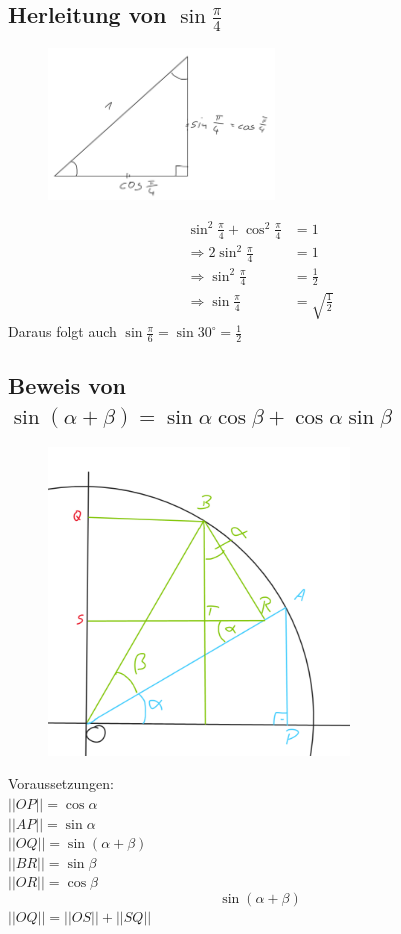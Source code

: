 \documentclass[a4paper,onecolumn,pdftex]{report}
\begin{document}
    \subsection*{Herleitung von $\sin\frac{\pi}{4}$}
    \begin{figure}
        \includegraphics[width=6cm]{2023-10-11_23h34_34.png}
    \end{figure}
    \begin{align*}
        \sin^2\frac{\pi}{4}+\cos^2\frac{\pi}{4}&=1 \\
        \Rightarrow 2\sin^2\frac{\pi}{4}&=1 \\
        \Rightarrow \sin^2\frac{\pi}{4}&=\frac{1}{2} \\
        \Rightarrow \sin\frac{\pi}{4}&= \sqrt{\frac{1}{2}}
    \end{align*}
    Daraus folgt auch $\sin\frac{\pi}{6}=\sin30^\circ=\frac{1}{2}$

    \vspace{20px}
    \subsection*{Beweis von $\sin(\alpha+\beta) = \sin\alpha\cos\beta + \cos\alpha\sin\beta$}
    \begin{figure}
        \includegraphics[width=8cm]{2023-10-15_22h32_08.png}
    \end{figure}
    \vspace{20px}
    Voraussetzungen:
    \vspace{10px} \\
    $||OP|| = \cos\alpha$ \\
    $||AP|| = \sin\alpha$ \\
    $||OQ|| = \sin(\alpha+\beta)$ \\
    $||BR|| = \sin\beta$ \\
    $||OR|| = \cos\beta$
    \vspace{200px} \\
    $$\sin(\alpha+\beta)$$
    $||OQ|| = ||OS|| + ||SQ||$
    
\end{document}
